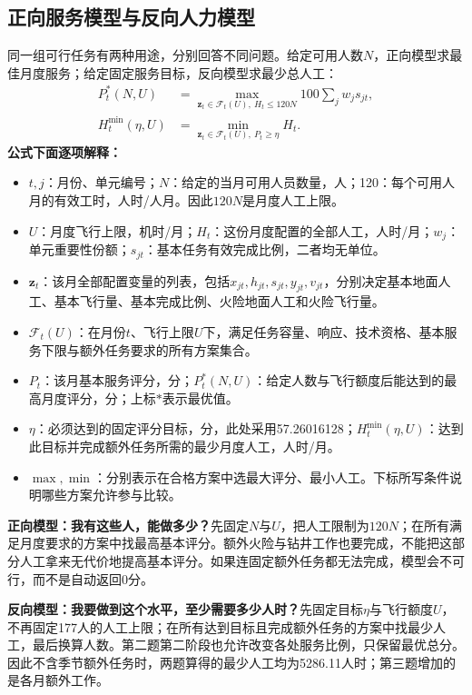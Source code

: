 \documentclass[12pt,a4paper]{article}
\numberwithin{equation}{section}
\begin{document}
\subsection{正向服务模型与反向人力模型}
同一组可行任务有两种用途，分别回答不同问题。给定可用人数$N$，正向模型求最佳月度服务；给定固定服务目标，反向模型求最少总人工：
\begin{equation}
\begin{aligned}
P_t^*(N,U)&=\max_{\mathbf z_t\in\mathcal F_t(U),\ H_t\le120N}
100\sum_jw_js_{jt},\\
H_t^{\min}(\eta,U)&=\min_{\mathbf z_t\in\mathcal F_t(U),\ P_t\ge\eta}H_t.
\end{aligned}
\label{eq:forwardinverse}
\end{equation}
\noindent\textbf{公式下面逐项解释：}
\begin{itemize}
\item $t,j$：月份、单元编号；$N$：给定的当月可用人员数量，人；120：每个可用人月的有效工时，人时/人月。因此$120N$是月度人工上限。
\item $U$：月度飞行上限，机时/月；$H_t$：这份月度配置的全部人工，人时/月；$w_j$：单元重要性份额；$s_{jt}$：基本任务有效完成比例，二者均无单位。
\item $\mathbf z_t$：该月全部配置变量的列表，包括$x_{jt},h_{jt},s_{jt},y_{jt},v_{jt}$，分别决定基本地面人工、基本飞行量、基本完成比例、火险地面人工和火险飞行量。
\item $\mathcal F_t(U)$：在月份$t$、飞行上限$U$下，满足任务容量、响应、技术资格、基本服务下限与额外任务要求的所有方案集合。
\item $P_t$：该月基本服务评分，分；$P_t^*(N,U)$：给定人数与飞行额度后能达到的最高月度评分，分；上标$*$表示最优值。
\item $\eta$：必须达到的固定评分目标，分，此处采用57.26016128；$H_t^{\min}(\eta,U)$：达到此目标并完成额外任务所需的最少月度人工，人时/月。
\item $\max,\min$：分别表示在合格方案中选最大评分、最小人工。下标所写条件说明哪些方案允许参与比较。
\end{itemize}
\noindent\textbf{正向模型：我有这些人，能做多少？}先固定$N$与$U$，把人工限制为$120N$；在所有满足月度要求的方案中找最高基本评分。额外火险与钻井工作也要完成，不能把这部分人工拿来无代价地提高基本评分。如果连固定额外任务都无法完成，模型会不可行，而不是自动返回0分。

\noindent\textbf{反向模型：我要做到这个水平，至少需要多少人时？}先固定目标$\eta$与飞行额度$U$，不再固定177人的人工上限；在所有达到目标且完成额外任务的方案中找最少人工，最后换算人数。第二题第二阶段也允许改变各处服务比例，只保留最优总分。因此不含季节额外任务时，两题算得的最少人工均为5286.11人时；第三题增加的是各月额外工作。
\end{document}
